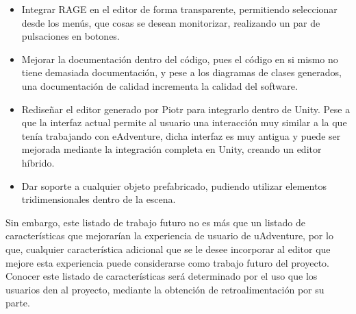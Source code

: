 \begin{itemize}
	\item Integrar RAGE en el editor de forma transparente, permitiendo seleccionar desde los menús, que cosas se desean monitorizar, realizando un par de pulsaciones en botones.
	
	\item Mejorar la documentación dentro del código, pues el código en si mismo no tiene demasiada documentación, y pese a los diagramas de clases generados, una documentación de calidad incrementa la calidad del software.
	
	\item Rediseñar el editor generado por Piotr para integrarlo dentro de Unity. Pese a que la interfaz actual permite al usuario una interacción muy similar a la que tenía trabajando con eAdventure, dicha interfaz es muy antigua y puede ser mejorada mediante la integración completa en Unity, creando un editor híbrido.
	
	\item Dar soporte a cualquier objeto prefabricado, pudiendo utilizar elementos tridimensionales dentro de la escena.
\end{itemize}

Sin embargo, este listado de trabajo futuro no es más que un listado de características que mejorarían la experiencia de usuario de uAdventure, por lo que, cualquier característica adicional que se le desee incorporar al editor que mejore esta experiencia puede considerarse como trabajo futuro del proyecto. Conocer este listado de características será determinado por el uso que los usuarios den al proyecto, mediante la obtención de retroalimentación por su parte.